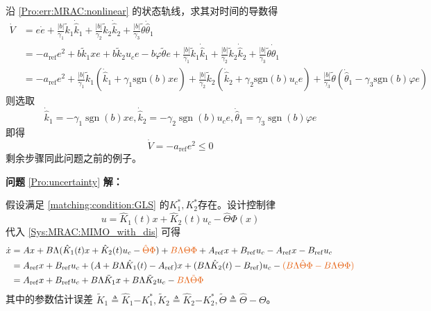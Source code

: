 沿 \eqref{Pro:err:MRAC:nonlinear} 的状态轨线，求其对时间的导数得
\begin{equation*}
    \begin{aligned}\dot{V}&= e\dot{e}+\frac{|b|}{\gamma_{1}}\tilde{k}_{1}\dot{\hat{k}}_{1}+\frac{|b|}{\gamma_{2}}\tilde{k}_{2}\dot{\hat{k}}_{2}+\frac{|b|}{\gamma_{3}}\tilde{\theta}\dot{\hat{\theta}}_{1}\\
    &=-a_{\mathrm{ref}}e^{2}+b\tilde{k}_{1}xe+b\tilde{k}_{2}u_{c}e-b\varphi\tilde{\theta}e+\frac{|b|}{\gamma_{1}}\tilde{k}_{1}\dot{\hat{k}}_{1}+\frac{|b|}{\gamma_{2}}\tilde{k}_{2}\dot{\hat{k}}_{2}+\frac{|b|}{\gamma_{3}}\tilde{\theta}\dot{\hat{\theta}}_{1}\\
    &=-a_{\mathrm{ref}}e^{2}+\frac{|b|}{\gamma_{1}}\tilde{k}_{1}\left(\dot{\hat{k}}_{1}+\gamma_{1}\mathrm{sgn}(b)xe\right)+\frac{|b|}{\gamma_{2}}\tilde{k}_{2}\left(\dot{\hat{k}}_{2}+\gamma_{2}\mathrm{sgn}(b)u_{c}e\right)+\frac{|b|}{\gamma_{3}}\tilde{\theta}\left(\dot{\hat{\theta}}_{1}-\gamma_{3}\mathrm{sgn}(b)\varphi e\right)\end{aligned}
\end{equation*}
则选取
\begin{equation*}
  \dot{\hat{k}}_1 = -  \gamma_1 \ensuremath{\operatorname{sgn}} (b) x  e,
  \dot{\hat{k}}_2 = -  \gamma_2 \ensuremath{\operatorname{sgn}} (b)  u_c e,
  \dot{\hat{\theta}}_1 = \gamma_3 \ensuremath{\operatorname{sgn}} (b)   \varphi e
\end{equation*}
即得
\begin{equation*}
  \dot{V} = - a_{\ensuremath{\operatorname{ref}}} e^2 \leq 0
\end{equation*}
剩余步骤同此问题之前的例子。

\noindent\textbf{问题} \ref{Pro:uncertainty} \textbf{解：}

假设满足 \eqref{matching:condition:GLS} 的$K^{\ast}_1, K^{\ast}_2$存在。设计控制律\[ u = \hat{K}_1 (t) x + \hat{K}_2 (t) u_c - \hat{\Theta}\Phi (x)  \]
代入 \eqref{Sys:MRAC:MIMO_with_dis} 可得
\begin{align}
    \dot{x}&=A  x + B \Lambda (\hat{K}_1 (t) x + \hat{K}_2 (t) u_c-\textcolor{second}{\hat{\Theta}\Phi})+\textcolor{second}{B\Lambda\Theta\Phi}+
    A_{\ensuremath{\operatorname{ref}}} x +
    B_{\ensuremath{\operatorname{ref}}} u_c-A_{\ensuremath{\operatorname{ref}}} x -
    B_{\ensuremath{\operatorname{ref}}} u_c\nonumber\\
    &=A_{\ensuremath{\operatorname{ref}}} x +
    B_{\ensuremath{\operatorname{ref}}} u_c+(A + B \Lambda \hat{K}_1 (t)-A_{\ensuremath{\operatorname{ref}}}) x+(B\Lambda\hat{K}_2 (t)-B_{\ensuremath{\operatorname{ref}}}) u_c-\textcolor{second}{(B\Lambda\hat{\Theta}\Phi-B\Lambda\Theta\Phi)}\nonumber\\
    &=A_{\ensuremath{\operatorname{ref}}}  x +
   B_{\ensuremath{\operatorname{ref}}} u_c + B \Lambda  \tilde{K}_1 x + B
   \Lambda  \tilde{K}_2 u_c -\textcolor{second}{B\Lambda\tilde{\Theta}\Phi}\label{mimo_with_dis_dotx}
\end{align}
其中的参数估计误差 $\tilde{K}_1 \triangleq \hat{K}_1 {- K_1^{\ast}} , \tilde{K}_2 \triangleq \hat{K}_2 {- K_2^{\ast}} ,\tilde{\Theta}\triangleq\hat{\Theta}-\Theta$。

